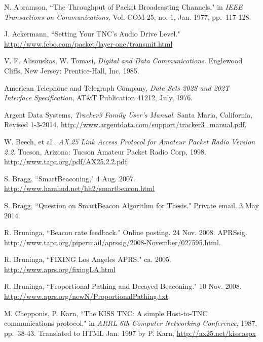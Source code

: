 \begin{thebibliography}{99}


		N. Abramson,
		``The Throughput of Packet Broadcasting Channels," in
		\emph{IEEE Transactions on Communications,}
		Vol. COM-25, no. 1, Jan. 1977, pp.~117-128.

		J. Ackermann,
		``Setting Your TNC's Audio Drive Level."
		\url{http://www.febo.com/packet/layer-one/transmit.html}

		V. F. Alisouskas, W. Tomasi, 
		\emph{Digital and Data Communications}.
		Englewood Cliffs, New Jersey: Prentice-Hall, Inc, 1985.

		American Telephone and Telegraph Company,
		\emph{Data Sets 202S and 202T Interface Specification},
		AT\&T Publication 41212,
		July, 1976.

		Argent Data Systems,
		\emph{Tracker3 Family User's Manual}.
		Santa Maria, California,
		Revised 1-3-2014.
		\url{http://www.argentdata.com/support/tracker3_manual.pdf}.

		W. Beech, et al.,
		\emph{AX.25 Link Access Protocol for Amateur Packet Radio Version 2.2}.
		Tucson, Arizona: Tucson Amateur Packet Radio Corp, 1998. 
		\url{http://www.tapr.org/pdf/AX25.2.2.pdf}

		S. Bragg, 
		``SmartBeaconing\texttrademark,"
		4 Aug. 2007.
		\url{http://www.hamhud.net/hh2/smartbeacon.html}

		S. Bragg, ``Question on SmartBeacon Algorithm for Thesis."
		Private email. 3 May 2014.

		R. Bruninga,
		``Beacon rate feedback."
		Online posting. 24 Nov. 2008. APRSsig.
		\url{http://www.tapr.org/pipermail/aprssig/2008-November/027595.html}.

		R. Bruninga, ``FIXING Los Angeles APRS."
		ca. 2005.
		\url{http://www.aprs.org/fixingLA.html}

		R. Bruninga, ``Proportional Pathing and Decayed Beaconing."
		10 Nov. 2008.
		\url{http://www.aprs.org/newN/ProportionalPathing.txt}

		M. Chepponis, P. Karn,
		``The KISS TNC: A simple Host-to-TNC communications protocol,"
		in \emph{ARRL 6th Computer Networking Conference},
		1987, pp.~38-43.
		Translated to HTML Jan. 1997 by P. Karn,
		\url{http://ax25.net/kiss.aspx}


\end{thebibliography}
